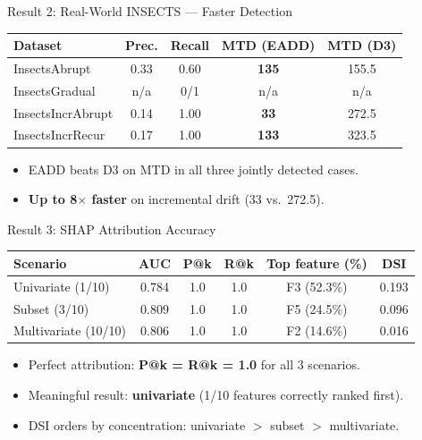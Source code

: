 \documentclass[aspectratio=169,10pt]{beamer}
\begin{document}
\begin{frame}{Result 2: Real-World INSECTS — Faster Detection}
\centering\small
\begin{tabular}{lcccc}
\toprule
\textbf{Dataset} & \textbf{Prec.} & \textbf{Recall} & \textbf{MTD (EADD)} & \textbf{MTD (D3)} \\
\midrule
InsectsAbrupt      & 0.33 & 0.60 & \textbf{135} & 155.5 \\
InsectsGradual     & n/a  & 0/1  & n/a          & n/a   \\
InsectsIncrAbrupt  & 0.14 & 1.00 & \textbf{33}  & 272.5 \\
InsectsIncrRecur   & 0.17 & 1.00 & \textbf{133} & 323.5 \\
\bottomrule
\end{tabular}

\bigskip
\begin{itemize}
\item EADD beats D3 on MTD in all three jointly detected cases.
\item \textbf{Up to 8$\times$ faster} on incremental drift (33 vs.\ 272.5).
\end{itemize}
\end{frame}

\begin{frame}{Result 3: SHAP Attribution Accuracy}
\centering\small
\begin{tabular}{lccccc}
\toprule
\textbf{Scenario} & \textbf{AUC} & \textbf{P@k} & \textbf{R@k} & \textbf{Top feature (\%)} & \textbf{DSI} \\
\midrule
Univariate (1/10)   & 0.784 & 1.0 & 1.0 & F3 (52.3\%) & 0.193 \\
Subset (3/10)       & 0.809 & 1.0 & 1.0 & F5 (24.5\%) & 0.096 \\
Multivariate (10/10)& 0.806 & 1.0 & 1.0 & F2 (14.6\%) & 0.016 \\
\bottomrule
\end{tabular}

\bigskip
\begin{itemize}
\item Perfect attribution: \textbf{P@k = R@k = 1.0} for all 3 scenarios.
\item Meaningful result: \textbf{univariate} (1/10 features correctly ranked first).
\item DSI orders by concentration: univariate $>$ subset $>$ multivariate.
\end{itemize}
\end{frame}
\end{document}
